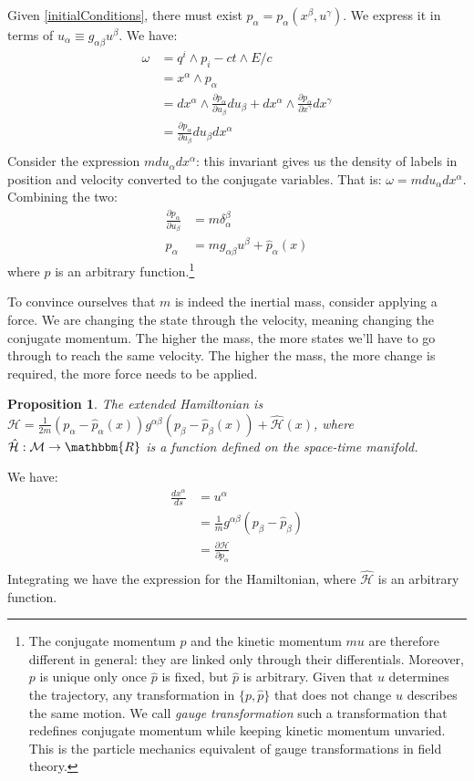 \documentclass[aps,pra,10pt,twocolumn,floatfix,nofootinbib]{revtex4-1}
\newtheorem{prop}[thm]{Proposition}
\theoremstyle{definition}
\begin{document}
Given \ref{initialConditions}, there must exist $p_\alpha=p_\alpha(x^\beta , u^\gamma)$. We express it in terms of $u_\alpha\equiv g_{\alpha \beta} u^\beta$. We have:
\begin{align*}
\omega &= q^i\wedge p_i - ct \wedge E/c \\
&=x^\alpha \wedge p_\alpha \\
&=dx^\alpha \wedge \frac{\partial p_\alpha}{\partial u_\beta}du_\beta + dx^\alpha \wedge \frac{\partial p_\alpha}{\partial x^\gamma}dx^\gamma \\
&=\frac{\partial p_\alpha}{\partial u_\beta}du_\beta dx^\alpha \\
\end{align*}
Consider the expression $m du_\alpha dx^\alpha$: this invariant gives us the density of labels in position and velocity converted to the conjugate variables. That is: $\omega=m du_\alpha dx^\alpha$. Combining the two:
\begin{align*}
\frac{\partial p_\alpha}{\partial u_\beta} &= m \delta^\beta_\alpha \\
p_\alpha &= m g_{\alpha \beta}u^\beta + \hat{p}_\alpha(x)
\end{align*}
where $\hat{p}$ is an arbitrary function.\footnote{The conjugate momentum $p$ and the kinetic momentum $mu$ are therefore different in general: they are linked only through their differentials. Moreover, $p$ is unique only once $\hat{p}$ is fixed, but $\hat{p}$ is arbitrary. Given that $u$ determines the trajectory, any transformation in $\{p, \hat{p} \}$ that does not change $u$ describes the same motion. We call \emph{gauge transformation} such a transformation that redefines conjugate momentum while keeping kinetic momentum unvaried. This is the particle mechanics equivalent of gauge transformations in field theory.}

To convince ourselves that $m$ is indeed the inertial mass, consider applying a force. We are changing the state through the velocity, meaning changing the conjugate momentum. The higher the mass, the more states we'll have to go through to reach the same velocity. The higher the mass, the more change is required, the more force needs to be applied.

\begin{prop}\label{kineticHamiltonian}
The extended Hamiltonian is $\mathcal{H}=\frac{1}{2m}(p_\alpha-\hat{p}_\alpha(x))g^{\alpha\beta}(p_\beta-\hat{p}_\beta(x))+\hat{\mathcal{H}}(x)$, where $\hat{\mathcal{H}} : \mathcal{M} \rightarrow \mathbbm{R}$ is a function defined on the space-time manifold.
\end{prop}
We have:
\begin{align*}
\frac{dx^\alpha}{ds} &= u^\alpha \\
&= \frac{1}{m}g^{\alpha\beta}(p_\beta-\hat{p}_\beta) \\
&= \frac{\partial \mathcal{H}}{\partial p_\alpha} \\
\end{align*}
Integrating we have the expression for the Hamiltonian, where $\hat{\mathcal{H}}$ is an arbitrary function.
\end{document}
